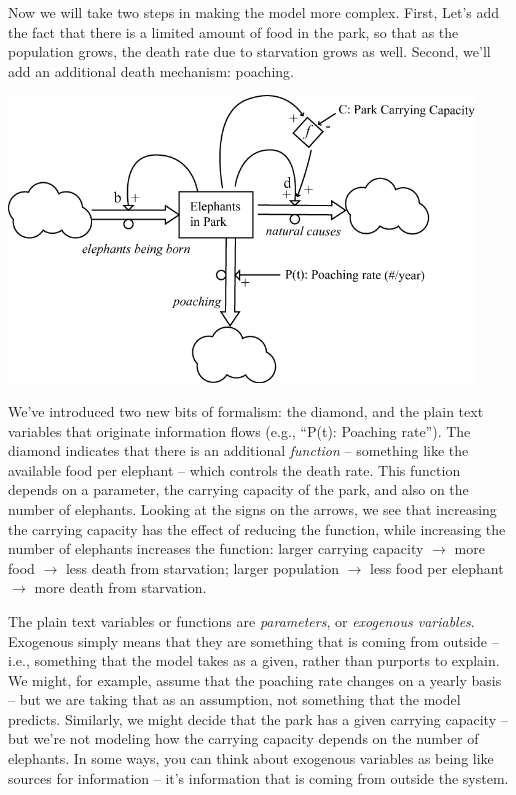 Now we will take two steps in making the model more complex.  First, Let's add the fact that there is a limited amount of food in the park, so that as the population grows, the death rate due to starvation grows as well.  Second, we'll add an additional death mechanism:  poaching.

\beforefig
\includegraphics[height=3in]{figs/ElephantStockAndFlow2}
\afterfig


We've introduced two new bits of formalism: the diamond, and the plain text variables that originate information flows (e.g., ``P(t): Poaching rate'').  The diamond indicates that there is an additional {\it function} -- something like the available food per elephant --  which controls the death rate.  This function depends on a parameter, the carrying capacity of the park, and also on the number of elephants. Looking at the signs on the arrows, we see that increasing the carrying capacity has the effect of reducing the function, while increasing the number of elephants increases the function:  larger carrying capacity $\rightarrow$ more food $\rightarrow$ less death from starvation; larger population $\rightarrow$ less food per elephant $\rightarrow$ more death from starvation.  

The plain text variables or functions are {\it parameters}, or {\it exogenous variables}.  Exogenous simply means that they are something that is coming from outside -- i.e., something that the model takes as a given, rather than purports to explain.  We might, for example, assume that the poaching rate changes on a yearly basis -- but we are taking that as an assumption, not something that the model predicts.  Similarly, we might decide that the park has a given carrying capacity  -- but we're not modeling how the carrying capacity depends on the number of elephants.  In some ways, you can think about exogenous variables as being like sources for information -- it's information that is coming from outside the system.

